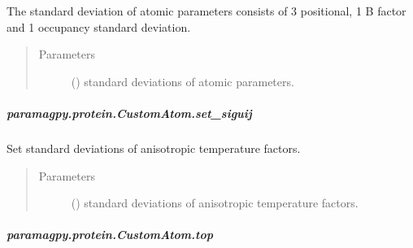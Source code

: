 \documentclass[a4paper,10pt,english,openany,oneside]{sphinxmanual}
\begin{document}
\begin{fulllineitems}
\begin{fulllineitems}
\begin{fulllineitems}
The standard deviation of atomic parameters consists
of 3 positional, 1 B factor and 1 occupancy standard
deviation.
\begin{quote}\begin{description}
\item[{Parameters}] \leavevmode
{} (\sphinxstyleliteralemphasis{\sphinxupquote{ (}}\sphinxstyleliteralemphasis{\sphinxupquote{)}}) \textendash{} standard deviations of atomic parameters.

\end{description}\end{quote}

\end{fulllineitems}



\subparagraph{paramagpy.protein.CustomAtom.set\_siguij}
\label{\detokenize{reference/generated/paramagpy.protein.CustomAtom.set_siguij:paramagpy-protein-customatom-set-siguij}}\label{\detokenize{reference/generated/paramagpy.protein.CustomAtom.set_siguij::doc}}

\begin{fulllineitems}
\label{\detokenize{reference/generated/paramagpy.protein.CustomAtom.set_siguij:paramagpy.protein.CustomAtom.set_siguij}}
Set standard deviations of anisotropic temperature factors.
\begin{quote}\begin{description}
\item[{Parameters}] \leavevmode
{} (\sphinxstyleliteralemphasis{\sphinxupquote{ (}}\sphinxstyleliteralemphasis{\sphinxupquote{)}}) \textendash{} standard deviations of anisotropic temperature factors.

\end{description}\end{quote}

\end{fulllineitems}



\subparagraph{paramagpy.protein.CustomAtom.top}
\label{\detokenize{reference/generated/paramagpy.protein.CustomAtom.top:paramagpy-protein-customatom-top}}\label{\detokenize{reference/generated/paramagpy.protein.CustomAtom.top::doc}}


\end{fulllineitems}
\end{fulllineitems}
\end{document}

